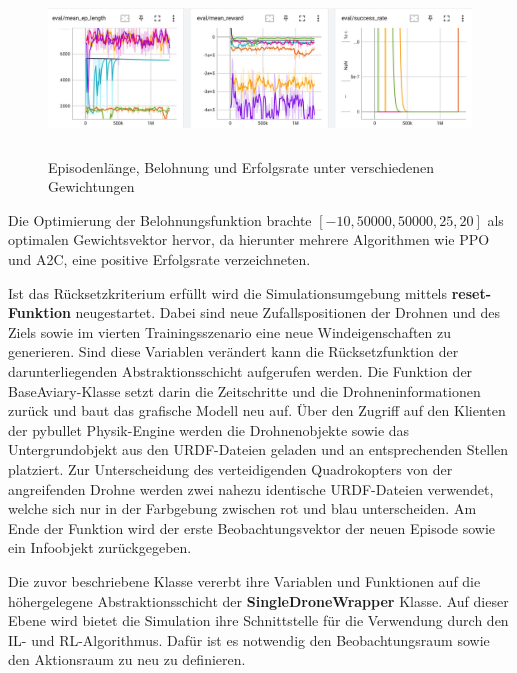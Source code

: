 \begin{figure}[htb]
    \centering
    \includegraphics[height=4.5cm]{lib/graphics/speed_reward_logs.png}
    \caption[Episodenlänge, Belohnung und Erfolgsrate unter verschiedenen Gewichtungen]{Episodenlänge, Belohnung und Erfolgsrate unter verschiedenen Gewichtungen\footnotemark}
    \label{abb:reward-logs}
\end{figure}

Die Optimierung der Belohnungsfunktion brachte $[-10, 50000, 50000, 25, 20]$ als optimalen Gewichtsvektor hervor, da hierunter mehrere Algorithmen wie PPO und A2C, eine positive Erfolgsrate verzeichneten.

Ist das Rücksetzkriterium erfüllt wird die Simulationsumgebung mittels \textbf{reset-Funktion} neugestartet.
Dabei sind neue Zufallspositionen der Drohnen und des Ziels sowie im vierten Trainingsszenario eine neue Windeigenschaften zu generieren.
Sind diese Variablen verändert kann die Rücksetzfunktion der darunterliegenden Abstraktionsschicht aufgerufen werden.
Die Funktion der BaseAviary-Klasse setzt darin die Zeitschritte und die Drohneninformationen zurück und baut das grafische Modell neu auf.
Über den Zugriff auf den Klienten der pybullet Physik-Engine werden die Drohnenobjekte sowie das Untergrundobjekt aus den URDF-Dateien geladen und an entsprechenden Stellen platziert.
Zur Unterscheidung des verteidigenden Quadrokopters von der angreifenden Drohne werden zwei nahezu identische URDF-Dateien verwendet, welche sich nur in der Farbgebung zwischen rot und blau unterscheiden.
Am Ende der Funktion wird der erste Beobachtungsvektor der neuen Episode sowie ein Infoobjekt zurückgegeben.

Die zuvor beschriebene Klasse vererbt ihre Variablen und Funktionen auf die höhergelegene Abstraktionsschicht der \textbf{SingleDroneWrapper} Klasse.
Auf dieser Ebene wird bietet die Simulation ihre Schnittstelle für die Verwendung durch den IL- und RL-Algorithmus.
Dafür ist es notwendig den Beobachtungsraum sowie den Aktionsraum zu neu zu definieren.

